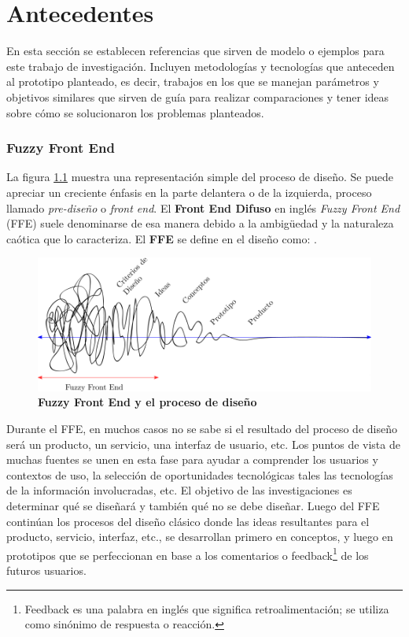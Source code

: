 \chapter{Antecedentes}
\label{chap: cap3}

En esta sección se establecen referencias que sirven de modelo o ejemplos para este trabajo de investigación. Incluyen metodologías y tecnologías que anteceden al prototipo planteado, es decir, trabajos en los que se manejan parámetros y objetivos similares que sirven de guía para realizar comparaciones y tener ideas sobre cómo se solucionaron los problemas planteados.

\subsection{Fuzzy Front End}
La figura \ref{fig:fuzzy1} muestra una representación simple del proceso de diseño. Se puede apreciar un creciente énfasis en la parte delantera o de la izquierda, proceso llamado \textit{pre-diseño} o \textit{front end}.
El \textbf{Front End Difuso} en inglés  \textit{Fuzzy Front End} (FFE) suele denominarse de esa manera debido a la ambigüedad y la naturaleza caótica que lo caracteriza. El \textbf{FFE} se define en el diseño como:  \citep{schreiner}.

\begin{figure}
\centering
\includegraphics[width=14cm]{Img/CPD/cpd-fuzzy.png}
\caption{\textbf{\footnotesize{Fuzzy Front End y el proceso de diseño}}}
\label{fig:fuzzy1}
\end{figure}

Durante el FFE, en muchos casos no se sabe si el resultado del proceso de diseño será un producto, un servicio, una interfaz de usuario, etc. Los puntos de vista de muchas fuentes se unen en esta fase para ayudar a comprender los usuarios y contextos de uso, la selección de oportunidades tecnológicas tales las tecnologías de la información involucradas, etc. El objetivo de las investigaciones es determinar qué se diseñará y también qué no se debe diseñar. Luego del FFE continúan los procesos del diseño clásico donde las ideas resultantes para el producto, servicio, interfaz, etc., se desarrollan primero en conceptos, y luego en prototipos que se perfeccionan en base a los comentarios o feedback\footnote{Feedback es una palabra en inglés que significa retroalimentación; se utiliza como sinónimo de respuesta o reacción.} de los futuros usuarios.


